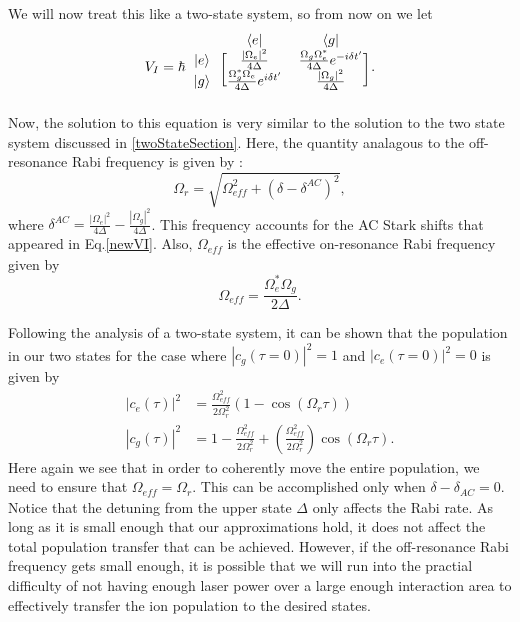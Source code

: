 We will now treat this like a two-state system, so from now on we let 
\begin{equation}
V_I=
\hbar
\begin{blockarray}{ccc}
&\langle e| & \langle g|\\
\begin{block}{c[cc]}
|e\rangle & \frac{|\Omega_e|^2}{4\Delta} & \frac{\Omega_g\Omega_e^*}{4\Delta}e^{-i\delta t'}\\
|g\rangle & \frac{\Omega_g^*\Omega_e}{4\Delta}e^{i\delta t'} & \frac{|\Omega_g|^2}{4\Delta}\\
\end{block}
\end{blockarray}.\label{newVI}
\end{equation}
Now, the solution to this equation is very similar to the solution to the two state system discussed in \ref{twoStateSection}. Here, the quantity analagous to the off-resonance Rabi frequency is given by \cite{Young1997363}: 
\begin{equation}
\Omega_\mathit{r}=\sqrt{\Omega_\mathit{eff}^2+(\delta-\delta^{AC})^2},
\end{equation}
where $\delta^{AC}= \frac{|\Omega_e|^2}{4\Delta}-\frac{|\Omega_g|^2}{4\Delta}$. This frequency accounts for the AC Stark shifts that appeared in Eq.\eqref{newVI}. Also, $\Omega_{\mathit{eff}}$ is the effective on-resonance Rabi frequency given by 
\begin{equation}
\Omega_{\mathit{eff}}=\frac{\Omega_e^*\Omega_g}{2\Delta}.
\end{equation}

Following the analysis of a two-state system, it can be shown that the population in our two states for the case where $|c_g(\tau=0)|^2=1$ and $|c_e(\tau=0)|^2=0$ is given by 
\begin{align}
|c_e(\tau)|^2&
=\frac{\Omega_{\mathit{eff}}^2}{2\Omega_r^2}(1-\cos(\Omega_r\tau))\\
|c_g(\tau)|^2&=
1-\frac{\Omega_{\mathit{eff}}^2}{2\Omega_r^2} + \left(\frac{\Omega_{\mathit{eff}}^2}{2\Omega_r^2}\right)\cos(\Omega_r \tau).
\end{align}
Here again we see that in order to coherently move the entire population, we need to ensure that $\Omega_{\mathit{eff}}=\Omega_r$. This can be accomplished only when $\delta-\delta_{AC}=0$. Notice that the detuning from the upper state $\Delta$ only affects the Rabi rate. As long as it is small enough that our approximations hold, it does not affect the total population transfer that can be achieved. However, if the off-resonance Rabi frequency gets small enough, it is possible that we will run into the practial difficulty of not having enough laser power over a large enough interaction area to effectively transfer the ion population to the desired states.


